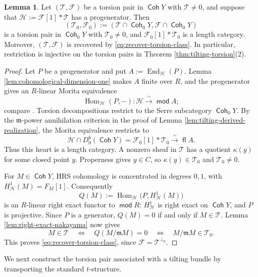 \documentclass[a4paper,reqno]{amsart}
\def\F{\mathcal{F}}
\def\H{\mathcal{H}}
\def\T{\mathcal{T}}
\def\m{\mathfrak{m}}
\DeclareMathOperator{\md}{\mathsf{mod}}
\renewcommand{\mod}{\md}
\DeclareMathOperator{\fl}{\mathsf{fl}}
\DeclareMathOperator{\Coh}{\mathsf{Coh}}
\DeclareMathOperator{\Hom}{Hom}
\DeclareMathOperator{\End}{End}
\theoremstyle{definition}
\newtheorem{Lem}[Thm]{Lemma}
\begin{document}
\begin{Lem}\label{lem:progenerator-restriction}
Let $(\T,\F)$ be a torsion pair in $\Coh Y$ with $\T\ne0$, and suppose that $\H:=\F[1]*\T$ has a progenerator. Then
\[
(\T_0,\F_0):=(\T\cap\Coh_0Y,\F\cap\Coh_0Y)
\]
is a torsion pair in $\Coh_0Y$ with $\T_0\ne0$, and $\F_0[1]*\T_0$ is a length category. Moreover, $(\T,\F)$ is recovered by \eqref{eq:recover-torsion-class}. In particular, restriction is injective on the torsion pairs in Theorem \ref{thm:tilting-torsion}(2).
\end{Lem}
\begin{proof}
Let $P$ be a progenerator and put $A:=\End_{\H}(P)$. Lemma \ref{lem:cohomological-dimension-one} makes $A$ finite over $R$, and the progenerator gives an $R$-linear Morita equivalence
\[
\Hom_{\H}(P,-)\colon\H\xrightarrow{\ \sim\ }\mod A;
\]
compare \cite[Lemma 3.2.1]{VdB04b}. Torsion decompositions restrict to the Serre subcategory $\Coh_0Y$. By the $\m$-power annihilation criterion in the proof of Lemma \ref{lem:tilting-derived-realization}, the Morita equivalence restricts to
\[
\H\cap D^b_0(\Coh Y)=\F_0[1]*\T_0
\xrightarrow{\ \sim\ }\fl A.
\]
Thus this heart is a length category. A nonzero sheaf in $\T$ has a quotient $\kappa(y)$ for some closed point $y$. Properness gives $y\in C$, so $\kappa(y)\in\T_0$ and $\T_0\ne0$.

For $M\in\Coh Y$, HRS cohomology is concentrated in degrees $0,1$, with $H^1_{\H}(M)=F_M[1]$. Consequently
\[
Q(M):=\Hom_{\H}\bigl(P,H^1_{\H}(M)\bigr)
\]
is an $R$-linear right exact functor to $\mod R$: $H^1_{\H}$ is right exact on $\Coh Y$, and $P$ is projective. Since $P$ is a generator, $Q(M)=0$ if and only if $M\in\T$. Lemma \ref{lem:right-exact-nakayama} now gives
\[
M\in\T\quad\Longleftrightarrow\quad
Q(M/\m M)=0\quad\Longleftrightarrow\quad
M/\m M\in\T_0.
\]
This proves \eqref{eq:recover-torsion-class}, since $\F=\T^{\perp_0}$.
\end{proof}

We next construct the torsion pair associated with a tilting bundle by transporting the standard $t$-structure.
\end{document}
